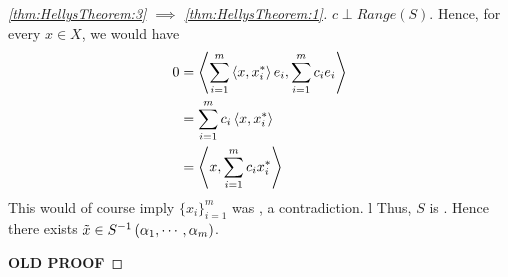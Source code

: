\begin{thm}
\begin{proof}[\ref{thm:HellysTheorem:3} $\implies$ \ref{thm:HellysTheorem:1}]
        $c \perp Range(S)$. 
        Hence, for every $x \in X$, we would have 
        \begin{align*}
        0 & = \left\langle \sum\limits_{i=1}^m \left\langle x, x_i^* \right\rangle e_i, \sum\limits_{i=1}^m c_i e_i \right\rangle\\
        & = \sum_{i=1}^m c_i \left\langle x, x_i^* \right\rangle\\
        & = \left\langle x, \sum\limits_{i=1}^m c_i x_i^* \right\rangle
        \end{align*}
        This would of course imply $\{x_i\}_{i=1}^m$ was \LinearlyDependent, a contradiction. l
        Thus, $S$ is \Surjective. 
        Hence there exists  $\tilde{x} \in S^{-1}\left( \alpha_1, \cdots, \alpha_m\right)$. 








        \bf OLD PROOF \rm 


\end{proof}
\end{thm}
